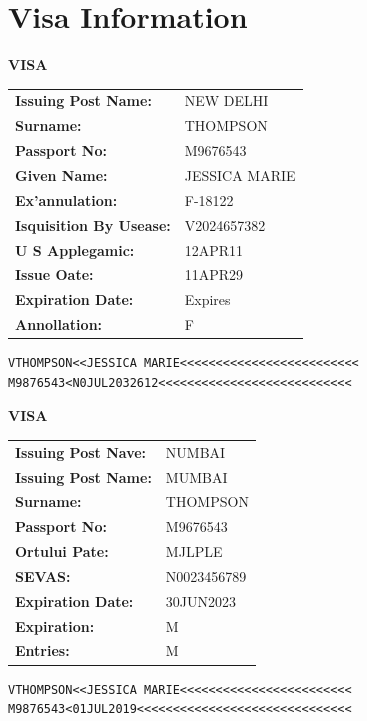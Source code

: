 \documentclass{article}
\begin{document}
\section*{Visa Information}

\textbf{VISA}

\begin{tabular}{ll}
  \textbf{Issuing Post Name:} & NEW DELHI \\
  \textbf{Surname:} & THOMPSON \\
  \textbf{Passport No:} & M9676543 \\
  \textbf{Given Name:} & JESSICA MARIE \\
  \textbf{Ex’annulation:} & F-18122 \\
  \textbf{Isquisition By Usease:} & V2024657382 \\
  \textbf{U S Applegamic:} & 12APR11 \\
  \textbf{Issue Oate:} & 11APR29 \\
  \textbf{Expiration Date:} & Expires \\
  \textbf{Annollation:} & F
\end{tabular}

\begin{verbatim}
VTHOMPSON<<JESSICA MARIE<<<<<<<<<<<<<<<<<<<<<<<<<
M9876543<N0JUL2032612<<<<<<<<<<<<<<<<<<<<<<<<<<<
\end{verbatim}

\vspace{1cm}

\textbf{VISA}

\begin{tabular}{ll}
  \textbf{Issuing Post Nave:} & NUMBAI \\
  \textbf{Issuing Post Name:} & MUMBAI \\
  \textbf{Surname:} & THOMPSON \\
  \textbf{Passport No:} & M9676543 \\
  \textbf{Ortului Pate:} & MJLPLE \\
  \textbf{SEVAS:} & N0023456789 \\
  \textbf{Expiration Date:} & 30JUN2023 \\
  \textbf{Expiration:} & M \\
  \textbf{Entries:} & M
\end{tabular}

\begin{verbatim}
VTHOMPSON<<JESSICA MARIE<<<<<<<<<<<<<<<<<<<<<<<<
M9876543<01JUL2019<<<<<<<<<<<<<<<<<<<<<<<<<<<<<<
\end{verbatim}
\end{document}

